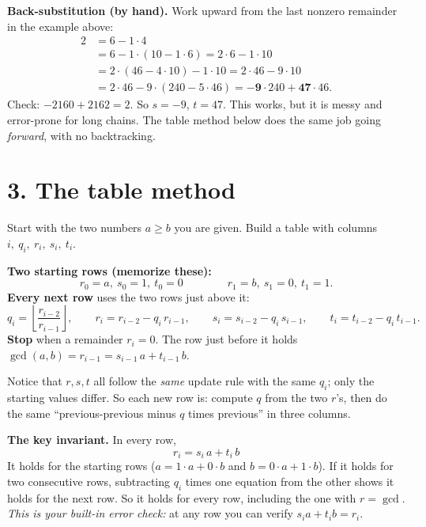 \documentclass[11pt]{article}
\begin{document}
\textbf{Back-substitution (by hand).} Work upward from the last nonzero remainder in the example above:
\begin{align*}
2 &= 6-1\cdot4\\
&= 6-1\cdot(10-1\cdot6)= 2\cdot6-1\cdot10\\
&= 2\cdot(46-4\cdot10)-1\cdot10 = 2\cdot46-9\cdot10\\
&= 2\cdot46-9\cdot(240-5\cdot46)= \mathbf{-9}\cdot240+\mathbf{47}\cdot46.
\end{align*}
Check: $-2160+2162=2$. So $s=-9$, $t=47$. This works, but it is messy and error-prone for long chains. The table method below does the same job going \emph{forward}, with no backtracking.

\hrulefill

\section*{3. The table method}

\begin{recipe}
Start with the two numbers $a\ge b$ you are given. Build a table with columns $i,\ q_i,\ r_i,\ s_i,\ t_i$.

\textbf{Two starting rows (memorize these):}
\[
r_0=a,\ s_0=1,\ t_0=0\qquad\qquad r_1=b,\ s_1=0,\ t_1=1.
\]
\textbf{Every next row} uses the two rows just above it:
\[
q_i=\left\lfloor \frac{r_{i-2}}{r_{i-1}}\right\rfloor,\qquad
r_i=r_{i-2}-q_i\,r_{i-1},\qquad
s_i=s_{i-2}-q_i\,s_{i-1},\qquad
t_i=t_{i-2}-q_i\,t_{i-1}.
\]
\textbf{Stop} when a remainder $r_i=0$. The row just before it holds $\gcd(a,b)=r_{i-1}=s_{i-1}\,a+t_{i-1}\,b$.
\end{recipe}

Notice that $r,s,t$ all follow the \emph{same} update rule with the same $q_i$; only the starting values differ. So each new row is: compute $q$ from the two $r$'s, then do the same ``previous-previous minus $q$ times previous'' in three columns.

\textbf{The key invariant.} In every row,
\[
\boxed{\,r_i = s_i\,a + t_i\,b\,}
\]
It holds for the starting rows ($a=1\cdot a+0\cdot b$ and $b=0\cdot a+1\cdot b$). If it holds for two consecutive rows, subtracting $q_i$ times one equation from the other shows it holds for the next row. So it holds for every row, including the one with $r=\gcd$. \emph{This is your built-in error check:} at any row you can verify $s_i a+t_ib=r_i$.
\end{document}
